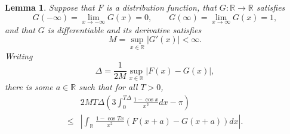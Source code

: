 \documentclass{article}
\newtheorem{lemma}[theorem]{Lemma}
\theoremstyle{definition}
\begin{document}
\begin{lemma}
Suppose that $F$ is a distribution function, that $G:\mathbb{R} \to \mathbb{R}$ satisfies
\[
G(-\infty)=\lim_{x \to -\infty} G(x) = 0, \qquad G(\infty) = \lim_{x \to \infty} G(x)=1,
\]
and that $G$ is differentiable and its derivative satisfies
\begin{equation}
M=\sup_{x \in \mathbb{R}} |G'(x)| < \infty.
\label{derivative}
\end{equation}
Writing
\[
\Delta = \frac{1}{2M} \sup_{x \in \mathbb{R}} |F(x)-G(x)|,
\]
there is some $a \in \mathbb{R}$ such that for all $T>0$,
\[
\begin{split}
&2MT\Delta \left(3\int_0^{T\Delta} \frac{1-\cos x}{x^2} dx - \pi\right)\\
\leq& \left| \int_\mathbb{R} \frac{1-\cos Tx}{x^2} (F(x+a)-G(x+a)) dx \right|.
\end{split}
\]
\label{esseen}
\end{lemma}
\end{document}
